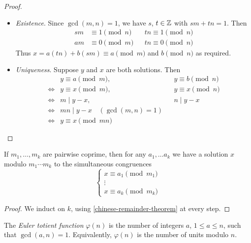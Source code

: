 \documentclass{../../template/note}
\begin{document}
    \begin{proof}
        \begin{itemize}
            \item \emph{Existence}. Since \(\gcd(m, n) = 1\), we have \(s\), \(t \in \mathbb Z\) with \(sm + tn = 1\). Then
            \begin{align*}
                sm &\equiv 1 \pmod n && tn \equiv 1 \pmod n \\
                am &\equiv 0 \pmod m && tn \equiv 0 \pmod n
            \end{align*}
            Thus \(x = a(tn) + b(sm) \equiv a \pmod m\) and \(b \pmod n\) as required.
            \item \emph{Uniqueness}. Suppose \(y\) and \(x\) are both solutions. Then
            \begin{align*}
                &y \equiv a \pmod m, && y \equiv b \pmod n \\
                \iff &y \equiv x \pmod m, && y \equiv x \pmod n \\
                \iff &m \mid y - x, && n \mid y - x \\
                \iff &mn \mid y - x \quad (\gcd(m, n) = 1) \\
                \iff &y \equiv x \pmod {mn}
            \end{align*}            
        \end{itemize}
    \end{proof}
    
    \begin{proposition}
        If \(m_1, \dots, m_k\) are pairwise coprime, then for any \(a_1, \dots a_k\) we have a solution \(x\) modulo \(m_1 \cdots m_k\) to the simultaneous congruences
        \[
            \begin{cases}
                x \equiv a_1 \pmod {m_1} \\
                \vdots \\
                x \equiv a_k \pmod {m_k}
            \end{cases}
        \]
    \end{proposition}
    
    \begin{proof}
        We induct on \(k\), using \cref{chinese-remainder-theorem} at every step.
    \end{proof}
    
    \begin{definition}
        The \emph{Euler totient function} \(\varphi(n)\) is the number of integers \(a\), \(1 \leq a \leq n\), such that \(\gcd(a, n) = 1\). Equivalently, \(\varphi(n)\) is the number of units modulo \(n\).
    \end{definition}
    
\end{document}
